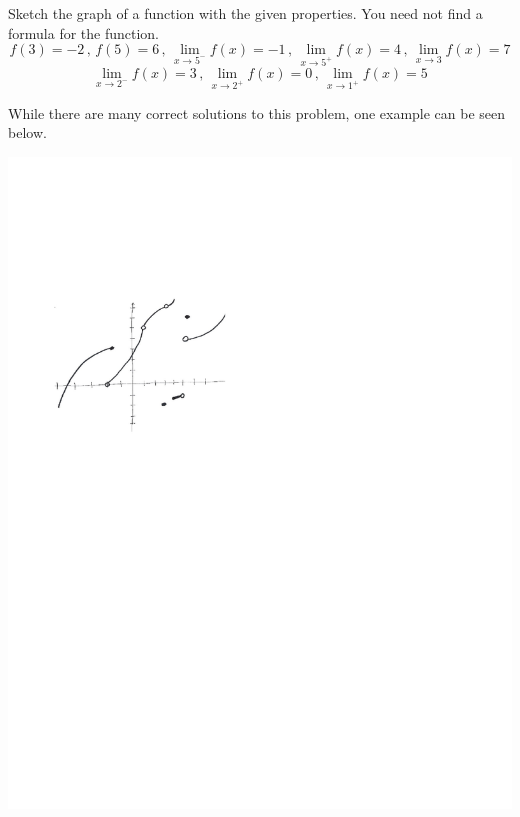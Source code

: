 \documentclass[handout,nooutcomes]{ximera}
\begin{document}
\begin{problem}
\begin{freeResponse}
	\end{freeResponse}
	
\end{problem}
			
			
			

\begin{problem}
Sketch the graph of a function with the given properties.  You need not find a formula for the function.
	$$ f(3) = -2 \, , \, f(5) = 6 \, , \, \lim_{x \to 5^-} f(x) = -1 \, , \,   \lim_{x \to 5^+} f(x) = 4 \, , \,  \lim_{x \to 3} f(x) = 7 $$
	$$  \lim_{x \to 2^-} f(x) = 3 \, , \,  \lim_{x \to 2^+} f(x) = 0 \, , \,  \lim_{x \to 1^+} f(x) = 5  $$
	\begin{freeResponse}
	While there are many correct solutions to this problem, one example can be seen below.
	
		\begin{image}
		\includegraphics[trim= 70 470 250 160]{Figure4.pdf}
		\end{image}
	\end{freeResponse}
\end{problem}
	
\end{document}
